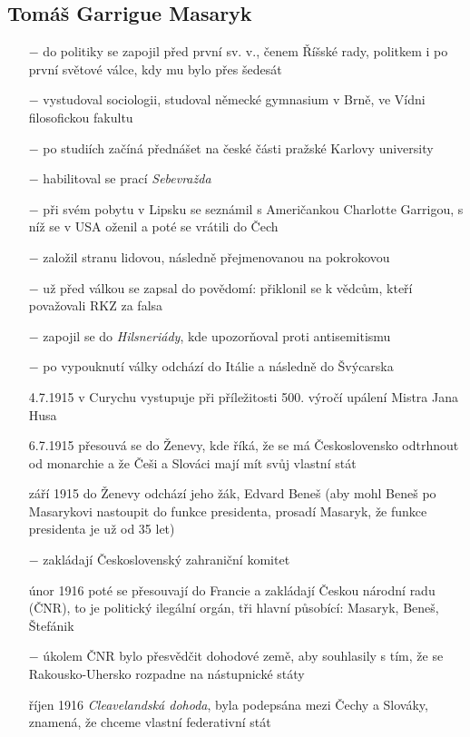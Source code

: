 \documentclass{article}
\begin{document}
\subsection*{Tomáš Garrigue Masaryk}
\begin{itemize}
    \vspace{-0.5em}
    \setlength\itemsep{0.15em}
    \item[$-$] do politiky se zapojil před první sv. v., čenem Říšské rady, politkem i po první světové válce, kdy mu bylo přes šedesát
    \item[$-$] vystudoval sociologii, studoval německé gymnasium v Brně, ve Vídni filosofickou fakultu
    \item[$-$] po studiích začíná přednášet na české části pražské Karlovy university
    \item[$-$] habilitoval se prací \textit{Sebevražda}
    \item[$-$] při svém pobytu v Lipsku se seznámil s Američankou Charlotte Garrigou, s níž se v USA oženil a poté se vrátili do Čech
    \item[$-$] založil stranu lidovou, následně přejmenovanou na pokrokovou
    \item[$-$] už před válkou se zapsal do povědomí: přiklonil se k vědcům, kteří považovali RKZ za falsa
    \item[$-$] zapojil se do \textit{Hilsneriády}, kde upozorňoval proti antisemitismu
    \item[$-$] po vypouknutí války odchází do Itálie a následně do Švýcarska
    \item[4.7.1915] v Curychu vystupuje při příležitosti 500. výročí upálení Mistra Jana Husa
    \item[6.7.1915] přesouvá se do Ženevy, kde říká, že se má Československo odtrhnout od monarchie a že Češi a Slováci mají mít svůj vlastní stát
    \item[září 1915] do Ženevy odchází jeho žák, Edvard Beneš (aby mohl Beneš po Masarykovi nastoupit do funkce presidenta, prosadí Masaryk, že funkce presidenta je už od 35 let)
    \item[$-$] zakládají Československý zahraniční komitet
    \item[únor 1916] poté se přesouvají do Francie a zakládají Českou národní radu (ČNR), to je politický ilegální orgán, tři hlavní působící: Masaryk, Beneš, Štefánik
    \item[$-$] úkolem ČNR bylo přesvědčit dohodové země, aby souhlasily s tím, že se Rakousko-Uhersko rozpadne na nástupnické státy
    \item[říjen 1916] \textit{Cleavelandská dohoda}, byla podepsána mezi Čechy a Slováky, znamená, že chceme vlastní federativní stát
\end{itemize}
\end{document}
